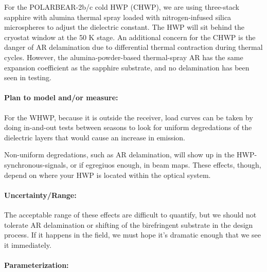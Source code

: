 For the POLARBEAR-2b/c cold HWP (CHWP), we are using three-stack sapphire with alumina thermal spray loaded with nitrogen-infused silica microspheres to adjust the dielectric constant. The HWP will sit behind the cryostat window at the 50 K stage. An additional concern for the CHWP is the danger of AR delamination due to differential thermal contraction during thermal cycles. However, the alumina-powder-based thermal-spray AR has the same expansion coefficient as the sapphire substrate, and no delamination has been seen in testing.
  
\paragraph{Plan to model and/or measure:}

For the WHWP, because it is outside the receiver, load curves can be taken by doing in-and-out tests between seasons to look for uniform degredations of the dielectric layers that would cause an increase in emission. 

Non-uniform degredations, such as AR delamination, will show up in the HWP-synchronous-signals, or if egregiuos enough, in beam maps. These effects, though, depend on where your HWP is located within the optical system.

\paragraph{Uncertainty/Range:}

The acceptable range of these effects are difficult to quantify, but we should not tolerate AR delamination or shifting of the birefringent substrate in the design process. If it happens in the field, we must hope it's dramatic enough that we see it immediately.

\paragraph{Parameterization:}
